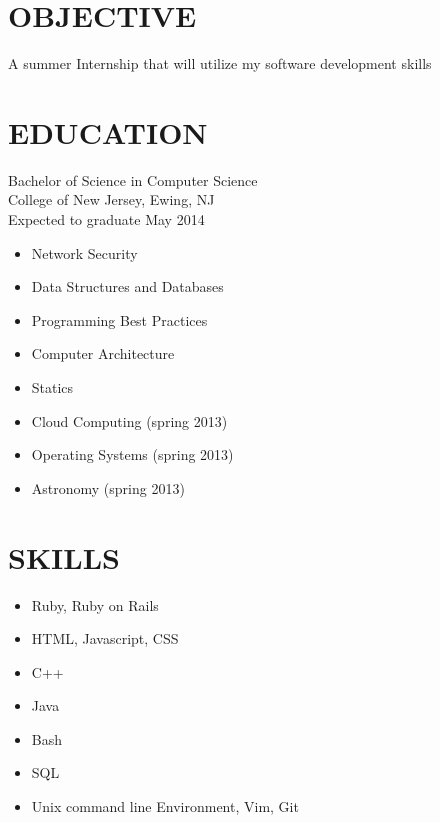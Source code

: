 \documentclass[line, margin]{res}
\begin{document}
  \address{63 Villa Ave. \\ Pitman, NJ 08071 \\ (609)-670-5137}

  \begin{resume}
    \section{OBJECTIVE}
    A summer Internship that will utilize my software development skills
    \section{EDUCATION}
    Bachelor of Science in Computer Science \\
    College of New Jersey, Ewing, NJ \\
    Expected to graduate May 2014
    \begin{itemize}
        \item Network Security
        \item Data Structures and Databases
        \item Programming Best Practices
        \item Computer Architecture
        \item Statics
        \item Cloud Computing (spring 2013)
        \item Operating Systems (spring 2013)
        \item Astronomy (spring 2013)
    \end{itemize}
    \section{SKILLS}
    \begin{itemize}
        \item Ruby, Ruby on Rails
        \item HTML, Javascript, CSS
        \item C++
        \item Java
        \item Bash
        \item SQL
        \item Unix command line Environment, Vim, Git
    \end{itemize}

\end{resume}
\end{document}
